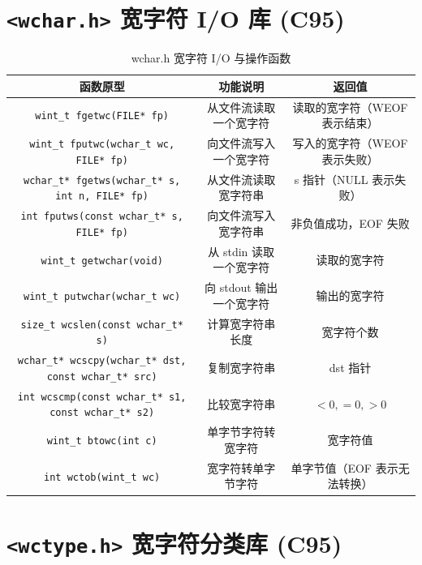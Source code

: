 \section{\texorpdfstring{\texttt{<wchar.h>} 宽字符 I/O 库 (C95)}{<wchar.h> 宽字符 I/O 库 (C95)}}

\begin{table}[H]
\centering
\small
\renewcommand{\arraystretch}{1.5}
\begin{tabulary}{\linewidth}{CCC}
\toprule
\textbf{函数原型} & \textbf{功能说明} & \textbf{返回值} \\ \midrule
\texttt{wint\_t fgetwc(FILE* fp)} & 从文件流读取一个宽字符 & 读取的宽字符（WEOF 表示结束） \\ 
\texttt{wint\_t fputwc(wchar\_t wc, FILE* fp)} & 向文件流写入一个宽字符 & 写入的宽字符（WEOF 表示失败） \\ 
\texttt{wchar\_t* fgetws(wchar\_t* s, int n, FILE* fp)} & 从文件流读取宽字符串 & s 指针（NULL 表示失败） \\ 
\texttt{int fputws(const wchar\_t* s, FILE* fp)} & 向文件流写入宽字符串 & 非负值成功，EOF 失败 \\ 
\texttt{wint\_t getwchar(void)} & 从 stdin 读取一个宽字符 & 读取的宽字符 \\ 
\texttt{wint\_t putwchar(wchar\_t wc)} & 向 stdout 输出一个宽字符 & 输出的宽字符 \\ 
\texttt{size\_t wcslen(const wchar\_t* s)} & 计算宽字符串长度 & 宽字符个数 \\ 
\texttt{wchar\_t* wcscpy(wchar\_t* dst, const wchar\_t* src)} & 复制宽字符串 & dst 指针 \\ 
\texttt{int wcscmp(const wchar\_t* s1, const wchar\_t* s2)} & 比较宽字符串 & $<0, =0, >0$ \\ 
\texttt{wint\_t btowc(int c)} & 单字节字符转宽字符 & 宽字符值 \\ 
\texttt{int wctob(wint\_t wc)} & 宽字符转单字节字符 & 单字节值（EOF 表示无法转换） \\ \bottomrule
\end{tabulary}
\caption{wchar.h 宽字符 I/O 与操作函数}
\label{tab:wchar}
\end{table}

\section{\texorpdfstring{\texttt{<wctype.h>} 宽字符分类库 (C95)}{<wctype.h> 宽字符分类库 (C95)}}

